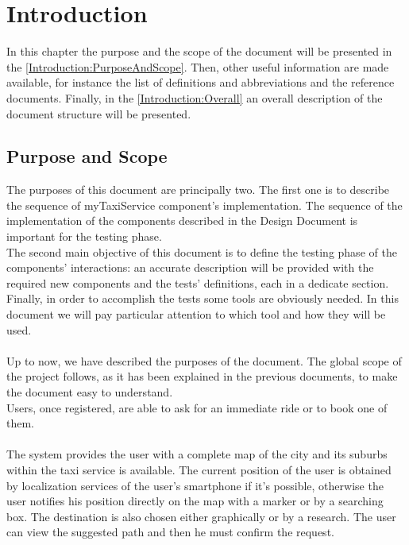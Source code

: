\documentclass[\mainpath/main]{subfiles}
\begin{document}
\chapter{Introduction} %
\label{Introduction}

\setmyfancystyle

In this chapter the purpose and the scope of the document will be presented in the \autoref{Introduction:PurposeAndScope}. Then, other useful information are made available, for instance the list of definitions and abbreviations and the reference documents. Finally, in the \autoref{Introduction:Overall} an overall description of the document structure will be presented.

\section{Purpose and Scope}
\label{Introduction:PurposeAndScope}
The purposes of this document are principally two. The first one is to describe the sequence of myTaxiService component's implementation. The sequence of the implementation of the components described in the Design Document is important for the testing phase.\\
 The second main objective of this document is to define the testing phase of the components' interactions: an accurate description will be provided with the required new components and the tests' definitions, each in a dedicate section.\\
 Finally, in order to accomplish the tests some tools are obviously needed. In this document we will pay particular attention to which tool and how they will be used.\\
 \\
 Up to now, we have described the purposes of the document. The global scope of the project follows, as it has been explained in the previous documents, to make the document easy to understand.\\
 Users, once registered, are able to ask for an immediate ride or to book one of them.\\
 \\
 The system provides the user with a complete map of the city and its suburbs within the taxi service is available. The current position of the user is obtained by localization services of the user's smartphone if it's possible, otherwise the user notifies his position directly on the map with a marker or by a searching box. The destination is also chosen either graphically or by a research. The user can view the suggested path and then he must confirm the request.\\
\end{document}
